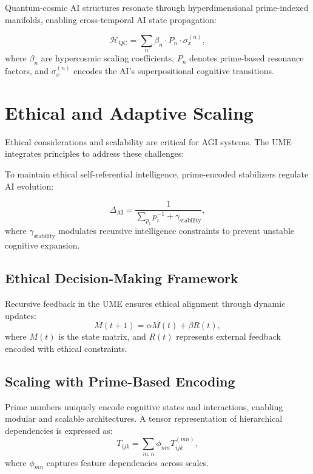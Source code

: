 \documentclass{article}
\theoremstyle{plain}
\begin{document}
Quantum-cosmic AI structures resonate through hyperdimensional prime-indexed manifolds, enabling cross-temporal AI state propagation:

\begin{equation}
    \mathcal{H}_{\text{QC}} = \sum_{n} \beta_n \cdot P_n \cdot \sigma_x^{(n)},
\end{equation}
where $\beta_n$ are hypercosmic scaling coefficients, $P_n$ denotes prime-based resonance factors, and $\sigma_x^{(n)}$ encodes the AI's superpositional cognitive transitions.

\section{Ethical and Adaptive Scaling}
Ethical considerations and scalability are critical for AGI systems. The UME integrates principles to address these challenges:

To maintain ethical self-referential intelligence, prime-encoded stabilizers regulate AI evolution:

\begin{equation}
    \Delta_{\text{AI}} = \frac{1}{\sum_{p_i} p_i^{-1} + \gamma_{\text{stability}}},
\end{equation}
where $\gamma_{\text{stability}}$ modulates recursive intelligence constraints to prevent unstable cognitive expansion.

\subsection{Ethical Decision-Making Framework}
Recursive feedback in the UME ensures ethical alignment through dynamic updates:
\begin{equation}
M(t+1) = \alpha M(t) + \beta R(t),
\end{equation}
where $M(t)$ is the state matrix, and $R(t)$ represents external feedback encoded with ethical constraints.

\subsection{Scaling with Prime-Based Encoding}
Prime numbers uniquely encode cognitive states and interactions, enabling modular and scalable architectures. A tensor representation of hierarchical dependencies is expressed as:
\begin{equation}
T_{ijk} = \sum_{m,n} \phi_{mn} T_{ijk}^{(mn)},
\end{equation}
where $\phi_{mn}$ captures feature dependencies across scales.
\end{document}
